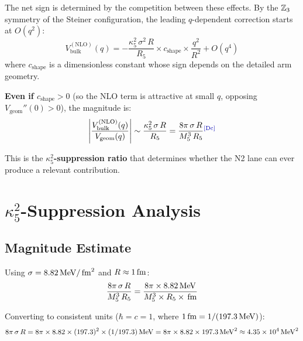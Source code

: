 The net sign is determined by the competition between these effects.
By the $\mathbb{Z}_3$ symmetry of the Steiner configuration, the leading
$q$-dependent correction starts at $O(q^2)$:
\begin{equation}
    V_{\mathrm{bulk}}^{(\mathrm{NLO})}(q) = -\frac{\kappa_5^2\,\sigma^2\,R}{R_5}
    \times c_{\mathrm{shape}} \times \frac{q^2}{R^2} + O(q^4)
    \label{eq:N2_VNLO_expansion}
\end{equation}
where $c_{\mathrm{shape}}$ is a dimensionless constant whose sign
depends on the detailed arm geometry. \tagDcI

\textbf{Even if $c_{\mathrm{shape}} > 0$} (so the NLO term is
attractive at small $q$, opposing $V_{\mathrm{geom}}''(0) > 0$),
the magnitude is:
\begin{equation}
    \left|\frac{V_{\mathrm{bulk}}^{(\mathrm{NLO})}(q)}{V_{\mathrm{geom}}(q)}\right|
    \sim \frac{\kappa_5^2\,\sigma\,R}{R_5}
    = \frac{8\pi\,\sigma\,R}{\Mfive^3\,R_5}
    \label{eq:N2_ratio}
    \tagDc
\end{equation}

This is the \textbf{$\kappa_5^2$-suppression ratio} that determines
whether the N2 lane can ever produce a relevant contribution.

\section{$\kappa_5^2$-Suppression Analysis}
\label{sec:P2N2:suppression}

\subsection{Magnitude Estimate}

Using $\sigma = 8.82\,\mathrm{MeV}/\,\mathrm{fm}^2$ and $R \approx 1\,\mathrm{fm}$:
\begin{equation}
    \frac{8\pi\,\sigma\,R}{M_5^3\,R_5}
    = \frac{8\pi \times 8.82\,\mathrm{MeV}}{M_5^3 \times R_5 \times \,\mathrm{fm}}
    \label{eq:N2_suppression_numeric}
\end{equation}

Converting to consistent units ($\hbar = c = 1$, where
$1\,\mathrm{fm} = 1/(197.3\,\mathrm{MeV})$):
\begin{equation}
    8\pi\,\sigma\, R = 8\pi \times 8.82 \times (197.3)^2 \times (1/197.3)\,\mathrm{MeV}
    = 8\pi \times 8.82 \times 197.3\,\mathrm{MeV}^2
    \approx 4.35 \times 10^4\,\mathrm{MeV}^2
    \label{eq:N2_numerator}
\end{equation}

